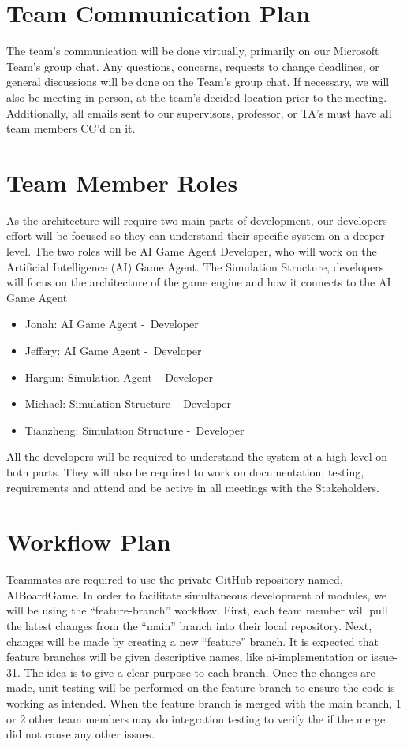 \documentclass{article}
\begin{document}
\section{Team Communication Plan}
The team’s communication will be done virtually, primarily on our Microsoft Team’s group chat. Any questions, concerns, requests to change deadlines, or general discussions will be done on the Team’s group chat. If necessary, we will also be meeting in-person, at the team’s decided location prior to the meeting. 
Additionally, all emails sent to our supervisors, professor, or TA’s must have all team members CC’d on it.
\section{Team Member Roles}
As the architecture will require two main parts of development, our developers effort will be focused so they can understand their specific system on a deeper level.
The two roles will be AI Game Agent Developer, who will work on the Artificial Intelligence (AI) Game Agent. The Simulation Structure, developers will focus on the architecture of the game engine and how it connects to the AI Game Agent
\begin{itemize}
	\item Jonah: AI Game Agent -\ Developer
	\item Jeffery: AI Game Agent -\ Developer
	\item Hargun: Simulation Agent -\ Developer
	\item Michael: Simulation Structure -\ Developer
	\item Tianzheng: Simulation Structure -\ Developer
\end{itemize}
All the developers will be required to understand the system at a high-level on both parts. They will also be required to work on documentation, testing, requirements and attend and be active in all meetings with the Stakeholders.
\section{Workflow Plan}
Teammates are required to use the private GitHub repository named, AIBoardGame. 
In order to facilitate simultaneous development of modules, we will be using the “feature-branch” workflow. First, each team member will pull the latest changes from the “main” branch into their local repository. 
Next, changes will be made by creating a new “feature” branch. It is expected that feature branches will be given descriptive names, like ai-implementation or issue-31. The idea is to give a clear purpose to each branch. 
Once the changes are made, unit testing will be performed on the feature branch to ensure the code is working as intended. 
When the feature branch is merged with the main branch, 1 or 2 other team members may do integration testing to verify the if the merge did not cause any other issues. 
\end{document}
